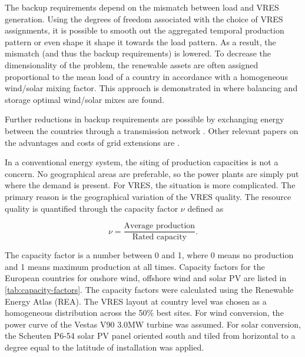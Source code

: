 \documentclass[a4paper, 5p, sort&compress]{elsarticle}%
\begin{document}
The backup requirements depend on the mismatch between load and VRES
generation. Using the degrees of freedom associated with the choice of
VRES assignments, it is possible to smooth out the aggregated temporal
production pattern or even shape it shape it towards the load
pattern. As a result, the mismatch (and thus the backup requirements)
is lowered.  To decrease the dimensionality of the problem, the
renewable assets are often assigned proportional to the mean load of a
country in accordance with a homogeneous wind/solar mixing
factor. This approach is demonstrated in
\cite{Heide2010,Heide2011} where balancing and storage optimal
wind/solar mixes are found.

Further reductions in backup requirements are possible by exchanging
energy between the countries through a transmission network
\cite{rolando2014,sarah}. Other relevant papers on the advantages and
costs of grid extensions are \cite{Schaber, Schaber2}.


In a conventional energy system, the siting of production capacities
is not a concern. No geographical areas are preferable, so the power
plants are simply put where the demand is present. For VRES, the
situation is more complicated. The primary reason is the geographical
variation of the VRES
quality. %
The resource quality is quantified through the capacity factor $\nu$ defined as

\begin{equation}
  \label{eq:1}
  \nu = \frac{\mbox{Average production}}{\mbox{Rated capacity}} .
\end{equation}

The capacity factor is a number between 0 and 1, where 0 means no
production and 1 means maximum production at all times. Capacity
factors for the European countries for onshore wind, offshore wind and
solar PV are listed in \cref{tab:capacity-factors}. The capacity
factors were calculated using the Renewable Energy Atlas \cite{REA}
(REA). The VRES layout at country level was chosen as a homogeneous
distribution across the 50\% best sites. For wind conversion, the
power curve of the Vestas V90 3.0MW turbine was assumed. For solar
conversion, the Scheuten P6-54 solar PV panel oriented south and tiled
from horizontal to a degree equal to the latitude of installation was
applied.
\end{document}
